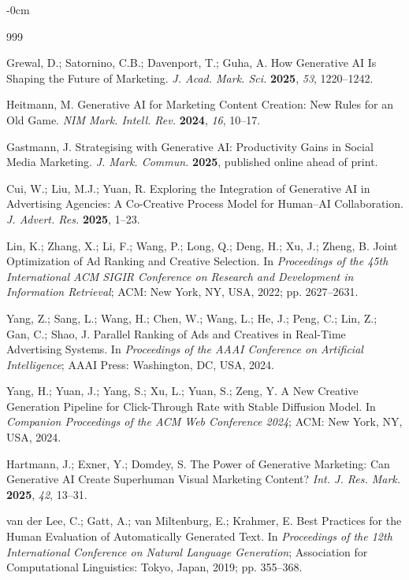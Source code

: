 \documentclass[applsci,article,submit,pdftex,moreauthors]{Definitions/mdpi}
\begin{document}
\begin{adjustwidth}{-\extralength}{0cm}
\begin{thebibliography}{999}

Grewal, D.; Satornino, C.B.; Davenport, T.; Guha, A.
How Generative AI Is Shaping the Future of Marketing.
\emph{J. Acad. Mark. Sci.} \textbf{2025}, \emph{53}, 1220--1242.

Heitmann, M.
Generative AI for Marketing Content Creation: New Rules for an Old Game.
\emph{NIM Mark. Intell. Rev.} \textbf{2024}, \emph{16}, 10--17.

Gastmann, J.
Strategising with Generative AI: Productivity Gains in Social Media Marketing.
\emph{J. Mark. Commun.} \textbf{2025}, published online ahead of print.

Cui, W.; Liu, M.J.; Yuan, R.
Exploring the Integration of Generative AI in Advertising Agencies: A Co-Creative Process Model for Human--AI Collaboration.
\emph{J. Advert. Res.} \textbf{2025}, 1--23.

Lin, K.; Zhang, X.; Li, F.; Wang, P.; Long, Q.; Deng, H.; Xu, J.; Zheng, B.
Joint Optimization of Ad Ranking and Creative Selection.
In \emph{Proceedings of the 45th International ACM SIGIR Conference on Research and Development in Information Retrieval}; ACM: New York, NY, USA, 2022; pp. 2627--2631.

Yang, Z.; Sang, L.; Wang, H.; Chen, W.; Wang, L.; He, J.; Peng, C.; Lin, Z.; Gan, C.; Shao, J.
Parallel Ranking of Ads and Creatives in Real-Time Advertising Systems.
In \emph{Proceedings of the AAAI Conference on Artificial Intelligence}; AAAI Press: Washington, DC, USA, 2024.

Yang, H.; Yuan, J.; Yang, S.; Xu, L.; Yuan, S.; Zeng, Y.
A New Creative Generation Pipeline for Click-Through Rate with Stable Diffusion Model.
In \emph{Companion Proceedings of the ACM Web Conference 2024}; ACM: New York, NY, USA, 2024.

Hartmann, J.; Exner, Y.; Domdey, S.
The Power of Generative Marketing: Can Generative AI Create Superhuman Visual Marketing Content?
\emph{Int. J. Res. Mark.} \textbf{2025}, \emph{42}, 13--31.

van der Lee, C.; Gatt, A.; van Miltenburg, E.; Krahmer, E.
Best Practices for the Human Evaluation of Automatically Generated Text.
In \emph{Proceedings of the 12th International Conference on Natural Language Generation}; Association for Computational Linguistics: Tokyo, Japan, 2019; pp. 355--368.

\end{thebibliography}
\PublishersNote{}
\end{adjustwidth}
\end{document}
